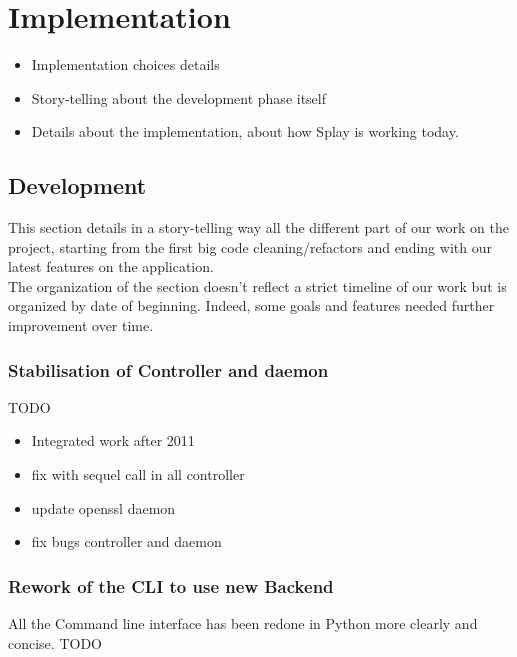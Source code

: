 \documentclass{eplmastersthesis}
\begin{document}

  \chapter{Implementation}


    \begin{itemize}
      \item Implementation choices details
      \item Story-telling about the development phase itself
      \item Details about the implementation, about how Splay is working today.
    \end{itemize}

    \section{Development}

      This section details in a story-telling way all the different part
      of our work on the project, starting from the first big code cleaning/refactors
      and ending with our latest features on the application.\\

      The organization of the section doesn't reflect a strict timeline of
      our work but is organized by date of beginning. Indeed, some goals
      and features needed further improvement over time.

      \subsection{Stabilisation of Controller and daemon}
        {\color{red} TODO}
        \begin{itemize}
          \item Integrated work after 2011
          \item fix with sequel call in all controller
          \item update openssl daemon
          \item fix bugs controller and daemon
        \end{itemize}

      \subsection{Rework of the CLI to use new Backend}

        All the Command line interface has been redone in Python more clearly and concise. {\color{red} TODO }


  \nocite{*}
  
  

  \backcoverpage
\end{document}
